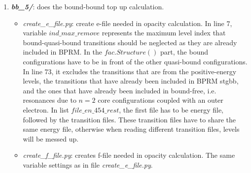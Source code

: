 \begin{enumerate}
	\item \textbf{\textit{bb\_5/}}: does the bound-bound top up calculation.
	\begin{itemize}
		\item \textit{create\_e\_file.py}: create e-file needed in opacity calculation. In line 7, variable $ind\_max\_remove$ represents the maximum level index that bound-quasi-bound transitions should be neglected as they are already included in BPRM. In the $fac.Structure()$ part, the bound configurations have to be in front of the other quasi-bound configurations. In line 73, it excludes the transitions that are from the positive-energy levels, the transitions that have already been included in BPRM stgbb, and the ones that have already been included in bound-free, i.e. resonances due to $n=2$ core configurations coupled with an outer electron. In list $file\_en\_454\_rest$, the first file has to be energy file, followed by the transition files. These transition files have to share the same energy file, otherwise when reading different transition files, levels will be messed up.
		\item \textit{create\_f\_file.py}: creates f-file needed in opacity calculation. The same variable settings as in file \textit{create\_e\_file.py}.
	\end{itemize}
\end{enumerate}


